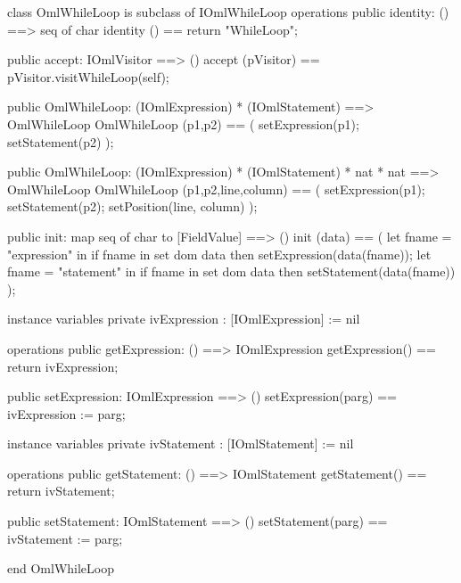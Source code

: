 \begin{vdm_al}
class OmlWhileLoop is subclass of IOmlWhileLoop
operations
  public identity: () ==> seq of char
  identity () == return "WhileLoop";

  public accept: IOmlVisitor ==> ()
  accept (pVisitor) == pVisitor.visitWhileLoop(self);

  public OmlWhileLoop:
    (IOmlExpression) *
    (IOmlStatement) ==> OmlWhileLoop
  OmlWhileLoop (p1,p2) == 
    ( setExpression(p1);
      setStatement(p2) );

  public OmlWhileLoop:
    (IOmlExpression) *
    (IOmlStatement) *
    nat *
    nat ==> OmlWhileLoop
  OmlWhileLoop (p1,p2,line,column) == 
    ( setExpression(p1);
      setStatement(p2);
      setPosition(line, column) );

  public init: map seq of char to [FieldValue] ==> ()
  init (data) ==
    ( let fname = "expression" in
        if fname in set dom data
        then setExpression(data(fname));
      let fname = "statement" in
        if fname in set dom data
        then setStatement(data(fname)) );

instance variables
  private ivExpression : [IOmlExpression] := nil

operations
  public getExpression: () ==> IOmlExpression
  getExpression() == return ivExpression;

  public setExpression: IOmlExpression ==> ()
  setExpression(parg) == ivExpression := parg;

instance variables
  private ivStatement : [IOmlStatement] := nil

operations
  public getStatement: () ==> IOmlStatement
  getStatement() == return ivStatement;

  public setStatement: IOmlStatement ==> ()
  setStatement(parg) == ivStatement := parg;

end OmlWhileLoop
\end{vdm_al}

